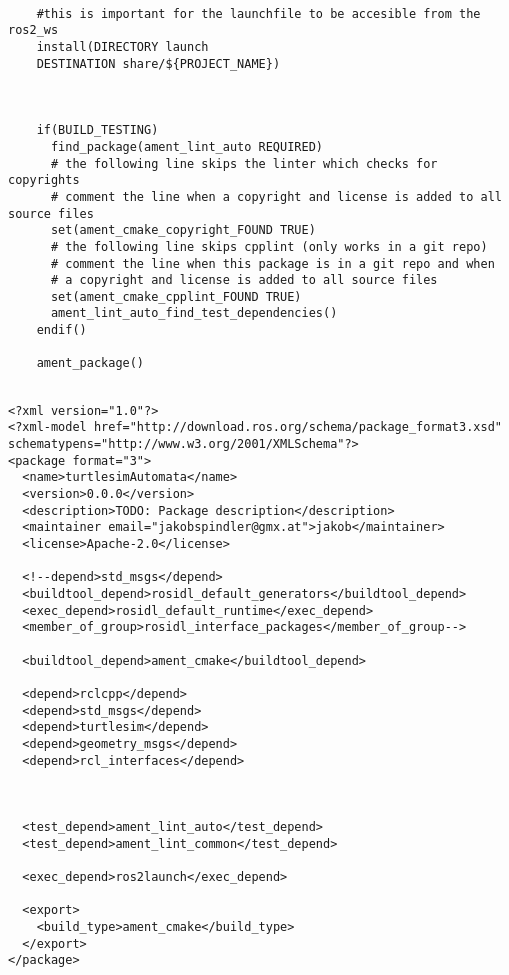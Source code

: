\begin{lstlisting}[caption={CMakeLists.txt}, label={lst:CMakeLists}]
      
    #this is important for the launchfile to be accesible from the ros2_ws
    install(DIRECTORY launch
    DESTINATION share/${PROJECT_NAME})
    
    
    
    if(BUILD_TESTING)
      find_package(ament_lint_auto REQUIRED)
      # the following line skips the linter which checks for copyrights
      # comment the line when a copyright and license is added to all source files
      set(ament_cmake_copyright_FOUND TRUE)
      # the following line skips cpplint (only works in a git repo)
      # comment the line when this package is in a git repo and when
      # a copyright and license is added to all source files
      set(ament_cmake_cpplint_FOUND TRUE)
      ament_lint_auto_find_test_dependencies()
    endif()
    
    ament_package()
    

\end{lstlisting}



\lstset{style=xmlstyle}
\begin{lstlisting}[caption={Package.xml}, label={lst:packagexml}]
    <?xml version="1.0"?>
<?xml-model href="http://download.ros.org/schema/package_format3.xsd" schematypens="http://www.w3.org/2001/XMLSchema"?>
<package format="3">
  <name>turtlesimAutomata</name>
  <version>0.0.0</version>
  <description>TODO: Package description</description>
  <maintainer email="jakobspindler@gmx.at">jakob</maintainer>
  <license>Apache-2.0</license>

  <!--depend>std_msgs</depend>
  <buildtool_depend>rosidl_default_generators</buildtool_depend>
  <exec_depend>rosidl_default_runtime</exec_depend>
  <member_of_group>rosidl_interface_packages</member_of_group-->

  <buildtool_depend>ament_cmake</buildtool_depend>

  <depend>rclcpp</depend>
  <depend>std_msgs</depend>
  <depend>turtlesim</depend>
  <depend>geometry_msgs</depend>
  <depend>rcl_interfaces</depend>



  <test_depend>ament_lint_auto</test_depend>
  <test_depend>ament_lint_common</test_depend>

  <exec_depend>ros2launch</exec_depend>

  <export>
    <build_type>ament_cmake</build_type>
  </export>
</package>

\end{lstlisting}

